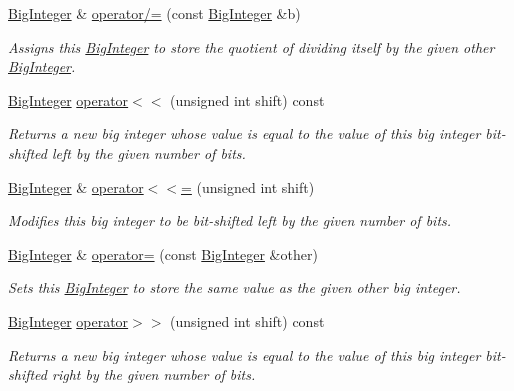 \begin{DoxyCompactItemize}
\mbox{\hyperlink{classBigInteger}{Big\+Integer}} \& \mbox{\hyperlink{classBigInteger_a15911ed7a428e4802403903565e74824}{operator/=}} (const \mbox{\hyperlink{classBigInteger}{Big\+Integer}} \&b)
\begin{DoxyCompactList}\small\item\em Assigns this \mbox{\hyperlink{classBigInteger}{Big\+Integer}} to store the quotient of dividing itself by the given other \mbox{\hyperlink{classBigInteger}{Big\+Integer}}. \end{DoxyCompactList}\item 
\mbox{\hyperlink{classBigInteger}{Big\+Integer}} \mbox{\hyperlink{classBigInteger_ac842accc04bc67769d5ac269f4a7a3f4}{operator$<$$<$}} (unsigned int shift) const
\begin{DoxyCompactList}\small\item\em Returns a new big integer whose value is equal to the value of this big integer bit-\/shifted left by the given number of bits. \end{DoxyCompactList}\item 
\mbox{\hyperlink{classBigInteger}{Big\+Integer}} \& \mbox{\hyperlink{classBigInteger_a339098d3b2c04e1bd7bf883e460f5aea}{operator$<$$<$=}} (unsigned int shift)
\begin{DoxyCompactList}\small\item\em Modifies this big integer to be bit-\/shifted left by the given number of bits. \end{DoxyCompactList}\item 
\mbox{\hyperlink{classBigInteger}{Big\+Integer}} \& \mbox{\hyperlink{classBigInteger_ac2c411cecad98a599e38ad10f1e27e45}{operator=}} (const \mbox{\hyperlink{classBigInteger}{Big\+Integer}} \&other)
\begin{DoxyCompactList}\small\item\em Sets this \mbox{\hyperlink{classBigInteger}{Big\+Integer}} to store the same value as the given other big integer. \end{DoxyCompactList}\item 
\mbox{\hyperlink{classBigInteger}{Big\+Integer}} \mbox{\hyperlink{classBigInteger_ae57cca21f624d67485bc6b516980d93e}{operator$>$$>$}} (unsigned int shift) const
\begin{DoxyCompactList}\small\item\em Returns a new big integer whose value is equal to the value of this big integer bit-\/shifted right by the given number of bits. \end{DoxyCompactList}\item 

\end{DoxyCompactItemize}
